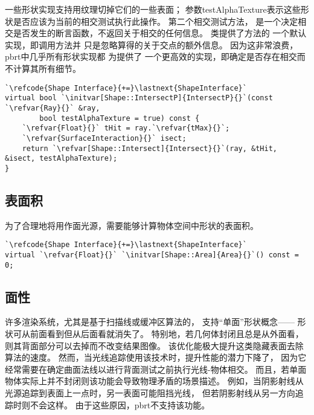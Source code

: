 一些形状实现支持用纹理切掉它们的一些表面；
参数{\ttfamily testAlphaTexture}表示这些形状是否应该为当前的相交测试执行此操作。
第二个相交测试方法，
是一个决定相交是否发生的断言函数，不返回关于相交的任何信息。
类提供了方法的
一个默认实现，即调用方法并
只是忽略算得的关于交点的额外信息。
因为这非常浪费，pbrt中几乎所有形状实现都
为提供了
一个更高效的实现，即确定是否存在相交而不计算其所有细节。
\begin{lstlisting}
`\refcode{Shape Interface}{+=}\lastnext{ShapeInterface}`
virtual bool `\initvar[Shape::IntersectP]{IntersectP}{}`(const `\refvar{Ray}{}` &ray,
        bool testAlphaTexture = true) const {
    `\refvar{Float}{}` tHit = ray.`\refvar{tMax}{}`;
    `\refvar{SurfaceInteraction}{}` isect;
    return `\refvar[Shape::Intersect]{Intersect}{}`(ray, &tHit, &isect, testAlphaTexture);
}
\end{lstlisting}

\subsection{表面积}\label{sub:表面积}
为了合理地将用作面光源，需要能够计算物体空间中形状的表面积。
\begin{lstlisting}
`\refcode{Shape Interface}{+=}\lastnext{ShapeInterface}`
virtual `\refvar{Float}{}` `\initvar[Shape::Area]{Area}{}`() const = 0;
\end{lstlisting}

\subsection{面性}\label{sub:面性}
许多渲染系统，尤其是基于扫描线或缓冲区算法的，
支持“单面”形状概念——
形状可从前面看到但从后面看就消失了。
特别地，若几何体封闭且总是从外面看，
则其背面部分可以去掉而不改变结果图像。
该优化能极大提升这类隐藏表面去除算法的速度。
然而，当光线追踪使用该技术时，提升性能的潜力下降了，
因为它经常需要在确定曲面法线以进行背面测试之前执行光线-物体相交。
而且，若单面物体实际上并不封闭则该功能会导致物理矛盾的场景描述。
例如，当阴影射线从光源追踪到表面上一点时，另一表面可能阻挡光线，
但若阴影射线从另一方向追踪时则不会这样。
由于这些原因，pbrt不支持该功能。